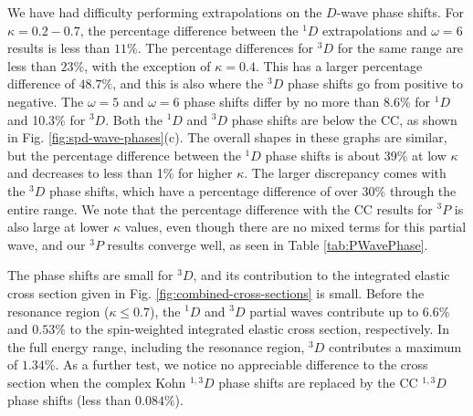 \documentclass[preprint,showpacs,showkeys,preprintnumbers,amsmath,amssymb,longbibliography,pra,aps]{revtex4-1}
\begin{document}
We have had difficulty performing extrapolations on the $D$-wave phase shifts. 
For $\kappa = 0.2 - 0.7$, the percentage difference between the $^1D$ 
extrapolations and $\omega = 6$ results is less than $11\%$. The percentage 
differences for $^3D$ for the same range are less than $23\%$, with the 
exception of $\kappa = 0.4$. This has a larger percentage difference of $48.7
\%$, and this is also where the $^3D$ phase shifts go from positive to 
negative. The
$\omega = 5$ and $\omega = 6$ phase shifts differ by no more than 8.6\% for
$^1D$ and 10.3\% for $^3D$. Both the $^1D$ and $^3D$ phase shifts are below the 
CC, as shown in Fig. \ref{fig:spd-wave-phases}(c). The overall shapes in these
graphs are similar, but the percentage difference between the $^1D$ phase
shifts is about 39\% at low $\kappa$ and decreases to less than 1\% for
higher $\kappa$. The larger discrepancy comes with the $^3D$ phase shifts,
which have a percentage difference of over 30\% through the entire range.
We note that the percentage difference with the CC results for $^3P$ is
also large at lower $\kappa$ values, even though there are no mixed terms
for this partial wave, and our $^3P$ results converge well, as seen in
Table \ref{tab:PWavePhase}. 

The phase shifts are small for $^3D$, and its contribution to the integrated 
elastic cross section given in Fig. \ref{fig:combined-cross-sections} is 
small. Before the resonance region ($\kappa \leq 0.7$), the $^1D$ and $^3D$ 
partial waves contribute up to $6.6\%$ and $0.53\%$ to the spin-weighted 
integrated elastic cross section, respectively. In the full energy range, 
including the resonance region, $^3D$ contributes a maximum of $1.34\%$. 
As a further test, we notice no appreciable difference to the cross section 
when the complex Kohn $^{1,3}D$ phase shifts are replaced by the CC
$^{1,3}D$ phase shifts (less than $0.084\%$).
\end{document}
